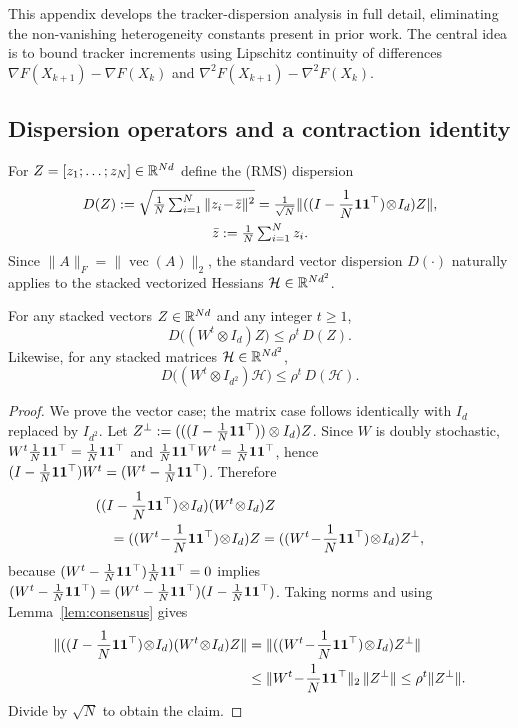 \documentclass[review,onefignum,onetabnum]{siamart171218}
\begin{document}
	This appendix develops the tracker-dispersion analysis in full detail,
	eliminating the non-vanishing heterogeneity constants present in prior
	work.
	The central idea is to bound tracker increments using Lipschitz
	continuity of differences
	$\nabla F(X_{k+1})-\nabla F(X_k)$ and
	$\nabla^2F(X_{k+1})-\nabla^2F(X_k)$.
	
	\subsection{Dispersion operators and a contraction identity}
	
	For $Z=[z_1;\dots;z_N]\in\mathbb{R}^{Nd}$ define the (RMS) dispersion
	\begin{gather*}
		D(Z):=\sqrt{\tfrac1N\textstyle\sum_{i=1}^N\|z_i\!-\!\bar z\|^2}
		=\tfrac{1}{\sqrt N}\|((I-\frac{1}{N}\mathbf{1}\mathbf{1}^\top)\!\otimes\! I_d)Z\|,\\
		\bar z:=\tfrac1N\textstyle\sum_{i=1}^N z_i.
	\end{gather*}
	Since $\|A\|_F = \|\operatorname{vec}(A)\|_2$, the standard vector dispersion $D(\cdot)$ naturally applies to the stacked vectorized Hessians $\mathcal{H} \in \mathbb{R}^{Nd^2}$.
	
	\begin{lemma}\label{lem:mix_contract}
		For any stacked vectors $Z\in\mathbb{R}^{Nd}$ and any integer $t\ge1$,
		\[
		D\big((W^t\otimes I_d)Z\big)\le \rho^t\,D(Z).
		\]
		Likewise, for any stacked matrices $\mathcal H\in\mathbb{R}^{Nd^2}$,
		\[
		D\big((W^t\otimes I_{d^2})\mathcal H\big)\le \rho^t\,D(\mathcal H).
		\]
	\end{lemma}
	\begin{proof}
		We prove the vector case; the matrix case follows identically with $I_d$ replaced by $I_{d^2}$.
		Let $Z^\perp:=(((I-\frac{1}{N}\mathbf{1}\mathbf{1}^\top))\otimes I_d)Z$. Since $W$ is doubly stochastic, $W^t\frac{1}{N}\mathbf{1}\mathbf{1}^\top=\frac{1}{N}\mathbf{1}\mathbf{1}^\top$ and $\frac{1}{N}\mathbf{1}\mathbf{1}^\top W^t=\frac{1}{N}\mathbf{1}\mathbf{1}^\top$, hence
		$(I-\frac{1}{N}\mathbf{1}\mathbf{1}^\top) W^t=(W^t-\frac{1}{N}\mathbf{1}\mathbf{1}^\top)$. Therefore
		\begin{align*}
			&(\Pmat\!\otimes\! I_d)(W^t\!\otimes\! I_d)Z\\
			&\quad=((W^t\!-\!\J)\!\otimes\! I_d)Z=((W^t\!-\!\J)\!\otimes\! I_d)Z^\perp,
		\end{align*}
		because $(W^t-\frac{1}{N}\mathbf{1}\mathbf{1}^\top)\frac{1}{N}\mathbf{1}\mathbf{1}^\top=0$ implies $(W^t-\frac{1}{N}\mathbf{1}\mathbf{1}^\top)=(W^t-\frac{1}{N}\mathbf{1}\mathbf{1}^\top)(I-\frac{1}{N}\mathbf{1}\mathbf{1}^\top)$.
		Taking norms and using Lemma~\ref{lem:consensus} gives
		\begin{align*}
			\|(\Pmat\!\otimes\! I_d)(W^t\!\otimes\! I_d)Z\|
			&=\|((W^t\!-\!\J)\!\otimes\! I_d)Z^\perp\|\\
			&\le \|W^t\!-\!\J\|_2\,\|Z^\perp\|
			\le \rho^t\|Z^\perp\|.
		\end{align*}
		Divide by $\sqrt N$ to obtain the claim.
	\end{proof}
	
\end{document}
